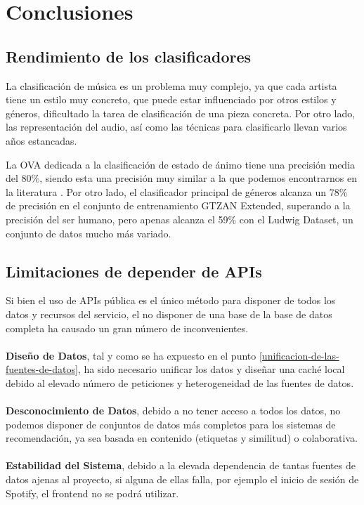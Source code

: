 
\section{Conclusiones}

\subsection{Rendimiento de los clasificadores}
La clasificación de música es un problema muy complejo, ya que cada artista tiene un estilo muy concreto, que puede estar influenciado por otros estilos y géneros, dificultado la tarea de clasificación de una pieza concreta. Por otro lado, las representación del audio, así como las técnicas para clasificarlo llevan varios años estancadas.

La OVA dedicada a la clasificación de estado de ánimo tiene una precisión media del 80\%, siendo esta una precisión muy similar a la que podemos encontrarnos en la literatura \cite{moods_classification}.
Por otro lado, el clasificador principal de géneros alcanza un 78\% de precisión en el conjunto de entrenamiento GTZAN Extended, superando a la precisión del ser humano, pero apenas alcanza el 59\% con el Ludwig Dataset, un conjunto de datos mucho más variado.\\


\subsection{Limitaciones de depender de APIs}
Si bien el uso de APIs pública es el único método para disponer de todos los datos y recursos del servicio, el no disponer de una base de la base de datos completa ha causado un gran número de inconvenientes.\\\\
\textbf{Diseño de Datos}, tal y como se ha expuesto en el punto \ref{unificacion-de-las-fuentes-de-datos}, ha sido necesario unificar los datos y diseñar una caché local debido al elevado número de peticiones y heterogeneidad de las fuentes de datos.\\\\
\textbf{Desconocimiento de Datos}, debido a no tener acceso a todos los datos, no podemos disponer de conjuntos de datos más completos para los sistemas de recomendación, ya sea basada en contenido (etiquetas y similitud) o colaborativa.\\\\
\textbf{Estabilidad del Sistema}, debido a la elevada dependencia de tantas fuentes de datos ajenas al proyecto, si alguna de ellas falla, por ejemplo el inicio de sesión de Spotify, el frontend no se podrá utilizar.

